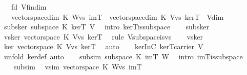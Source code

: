 \begin{isabellebody}
\ \ \ fd{\isacharcolon}\ {\isachardoublequoteopen}V{\isachardot}fin{\isacharunderscore}dim{\isachardoublequoteclose}\isanewline
\ \ \ {\isachardoublequoteopen}{\isacharparenleft}vectorspace{\isachardot}dim\ K\ {\isacharparenleft}W{\isachardot}vs\ imT{\isacharparenright}{\isacharparenright}\ {\isacharplus}\ {\isacharparenleft}vectorspace{\isachardot}dim\ K\ {\isacharparenleft}V{\isachardot}vs\ kerT{\isacharparenright}{\isacharparenright}\ {\isacharequal}\ V{\isachardot}dim{\isachardoublequoteclose}\isanewline
%
\isadelimproof
%
\endisadelimproof
%
\isatagproof
{}\isamarkupfalse%
\ {\isacharminus}\ \isanewline
\ \ %
\isanewline
\ \ \isamarkupfalse%
\ subs{\isacharunderscore}ker{\isacharcolon}\ {\isachardoublequoteopen}subspace\ K\ kerT\ V{\isachardoublequoteclose}\ \isamarkupfalse%
\ {\isacharparenleft}intro\ kerT{\isacharunderscore}is{\isacharunderscore}subspace{\isacharparenright}\isanewline
\ \ \isamarkupfalse%
\ subs{\isacharunderscore}ker\ \isamarkupfalse%
\ vs{\isacharunderscore}ker{\isacharcolon}\ {\isachardoublequoteopen}vectorspace\ K\ {\isacharparenleft}V{\isachardot}vs\ kerT{\isacharparenright}{\isachardoublequoteclose}\ \isamarkupfalse%
\ {\isacharparenleft}rule\ V{\isachardot}subspace{\isacharunderscore}is{\isacharunderscore}vs{\isacharparenright}\isanewline
\ \ \isamarkupfalse%
\ vs{\isacharunderscore}ker\ \isamarkupfalse%
\ ker{\isacharcolon}\ vectorspace\ K\ {\isachardoublequoteopen}{\isacharparenleft}V{\isachardot}vs\ kerT{\isacharparenright}{\isachardoublequoteclose}\ \isamarkupfalse%
\ auto\isanewline
\ \ \isamarkupfalse%
\ kerInC{\isacharcolon}\ {\isachardoublequoteopen}kerT{\isasymsubseteq}carrier\ V{\isachardoublequoteclose}\ \isamarkupfalse%
\ {\isacharparenleft}unfold\ ker{\isacharunderscore}def{\isacharcomma}\ auto{\isacharparenright}\isanewline
\isanewline
\ \ \isamarkupfalse%
\ subs{\isacharunderscore}im{\isacharcolon}\ {\isachardoublequoteopen}subspace\ K\ imT\ W{\isachardoublequoteclose}\ \isamarkupfalse%
\ {\isacharparenleft}intro\ imT{\isacharunderscore}is{\isacharunderscore}subspace{\isacharparenright}\ \ \isanewline
\ \ \isamarkupfalse%
\ subs{\isacharunderscore}im\ \isamarkupfalse%
\ vs{\isacharunderscore}im{\isacharcolon}\ {\isachardoublequoteopen}vectorspace\ K\ {\isacharparenleft}W{\isachardot}vs\ imT{\isacharparenright}{\isachardoublequoteclose}\ \isamarkupfalse%

\end{isabellebody}
